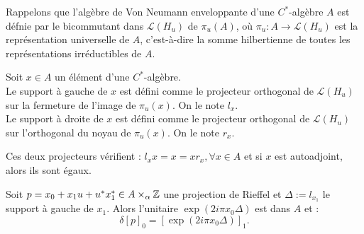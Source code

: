 Rappelons que l'algèbre de Von Neumann enveloppante d'une $C^*$-algèbre $A$ est défnie par le bicommutant dans $\mathcal L(H_u)$ de $\pi_u(A)$, où $\pi_u : A\rightarrow \mathcal L(H_u)$ est la représentation universelle de $A$, c'est-à-dire la somme hilbertienne de toutes les représentations irréductibles de $A$.

\begin{definition}
Soit $x\in A$ un élément d'une $C^*$-algèbre.\\
 Le support à gauche de $x$ est défini comme le projecteur orthogonal de $\mathcal L(H_u)$ sur la fermeture de l'image de $\pi_u(x)$. On le note $l_x$.\\
  Le support à droite de $x$ est défini comme le projecteur orthogonal de $\mathcal L(H_u)$ sur l'orthogonal du noyau de $\pi_u(x)$. On le note $r_x$.
\end{definition}
 
Ces deux projecteurs vérifient : $l_x x =x = x r_x, \forall x \in A$ et si $x$ est autoadjoint, alors ils sont égaux.\\

\begin{prop}
Soit $p=x_0+x_1 u +u^*x_1^*\in A\times_\alpha \mathbb Z$ une projection de Rieffel et $\Delta := l_{x_1}$ le support à gauche de $x_1$. Alors l'unitaire $\exp(2i\pi x_0 \Delta)$ est dans $A$ et :
\[\delta [p]_0=[\exp(2i\pi x_0 \Delta)]_1.\] 
\end{prop}

